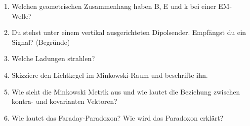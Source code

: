 \begin{enumerate}
  \item Welchen geometrischen Zusammenhang haben B, E und k bei einer EM-Welle? \\

  \item Du stehst unter einem vertikal ausgerichteten Dipolsender. Empfängst du ein Signal? (Begründe) \\

  \item Welche Ladungen strahlen? \\

  \item Skizziere den Lichtkegel im Minkowski-Raum und beschrifte ihn. \\

  \item Wie sieht die Minkowski Metrik aus und wie lautet die Beziehung zwischen kontra- und kovarianten Vektoren? \\

  \item Wie lautet das Faraday-Paradoxon? Wie wird das Paradoxon erklärt? \\

\end{enumerate}


